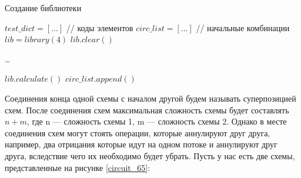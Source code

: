 \documentclass[14pt]{extarticle} %
\begin{document}
  \begin{algorithm}
	\caption{Создание библиотеки}\label{alg:bib}
	\begin{algorithmic}[1]
		
		\State $test\_dict=[\ldots]$ // коды элементов
		\State $circ\_list=[\ldots]$ // начальные комбинации
		\State $lib=library(4)$
		\State $lib.clear()$\par
		\State{}\par 
		\State\ldots
		
		\State \Return $lib.calculate()$
		\EndFunction
		\State
		\State{}
		\State $circ\_list.append()$
		\State {}\par
		\State{}
		\EndProcedure
		
		
	\end{algorithmic}
\end{algorithm}




Соединения конца одной схемы с началом другой будем называть суперпозицией схем. %
После соединения схем максимальная сложность схемы будет составлять $n+m$, где n --- сложность схемы 1, m --- сложность схемы 2. Однако в месте соединения схем могут стоять операции, которые аннулируют друг друга, например, два отрицания которые идут на одном потоке и аннулируют друг друга, вследствие чего их необходимо будет убрать. Пусть у нас есть две  схемы, представленные на рисунке \ref{circuit_65}:
\end{document}
